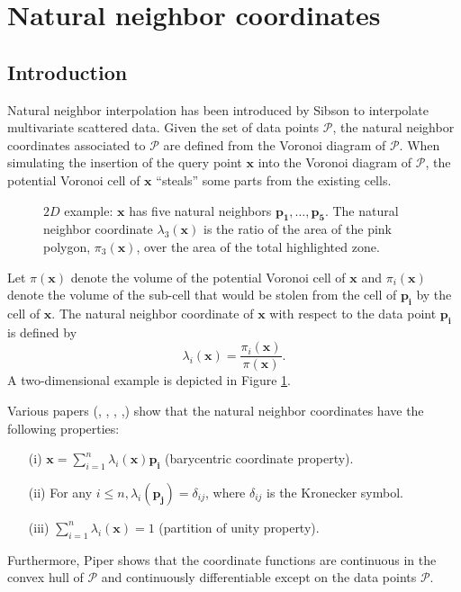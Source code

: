 \section{Natural neighbor coordinates}\label{sec:coordinates}
\subsection{Introduction}
Natural neighbor interpolation has been introduced by Sibson
\cite{s-bdnni-81} to interpolate multivariate scattered data.  Given
the set of data points $\mathcal{P}$, the natural neighbor coordinates
associated to $\mathcal{P}$ are defined from the Voronoi diagram of
$\mathcal{P}$.  When simulating the insertion of the query point
$\mathbf{x}$ into the Voronoi diagram of $\mathcal{P}$, the potential
Voronoi cell of $\mathbf{x}$ ``steals'' some parts from the existing
cells. 
\begin{figure}[ht!]
\begin{center}
   
\end{center}
\caption{$2D$ example: $\mathbf{x}$ has five natural neighbors $\mathbf{p_1},\ldots , \mathbf{p_5}$. 
  The natural neighbor coordinate $\lambda_3(\mathbf{x})$ is the ratio
  of the area of the pink polygon, $\pi_3(\mathbf{x})$, over the area
  of the total highlighted zone.
  \label{fig:nn_coords}}
\end{figure}
Let $\pi(\mathbf{x})$ denote the volume of the potential Voronoi cell
of $\mathbf{x}$ and $\pi_i(\mathbf{x})$ denote the volume of the
sub-cell that would be stolen from the cell of $\mathbf{p_i}$ by the
cell of $\mathbf{x}$.  The natural neighbor coordinate of $\mathbf{x}$
with respect to the data point $\mathbf{p_i}$ is defined by
$$
\lambda_i(\mathbf{x}) =
\frac{\pi_i(\mathbf{x})}{\pi(\mathbf{x})}.$$
A two-dimensional example
is depicted in Figure \ref{fig:nn_coords}.


Various papers (\cite{s-vidt-80}, \cite{f-sodt-90},
\cite{bp-plcbdt-93}, \cite{b-scaps-97},\cite{hs-vbihc-00}) show that
the natural neighbor coordinates have the following properties:
  \begin{itemize}
  \item[(i)] $\mathbf{x} = \sum_{i=1}^n \lambda_i(\mathbf{x}) \mathbf{p_i}$
    (barycentric coordinate property).
  \item[(ii)] For any $i \leq n, \lambda_i(\mathbf{p_j})= \delta_{ij}$, where
    $\delta_{ij}$ is the Kronecker symbol.
  \item[(iii)] $\sum_{i=1}^n \lambda_i(\mathbf{x}) = 1$ (partition of unity
    property).
  \end{itemize}
  Furthermore, Piper \cite{bp-plcbdt-93} shows that the coordinate
  functions are continuous in the convex hull of $\mathcal{P}$ and
  continuously differentiable except on the data points $\mathcal{P}$.
  \medskip
  
